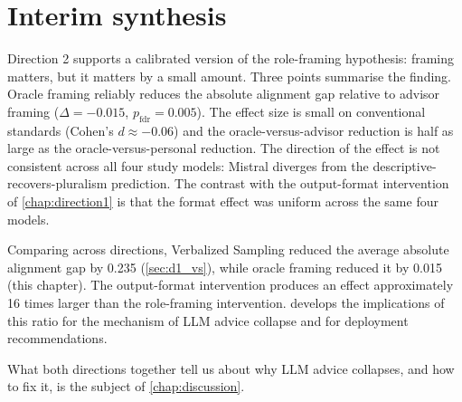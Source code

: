 \section{Interim synthesis}
\label{sec:d2_synthesis}

Direction 2 supports a calibrated version of the role-framing
hypothesis: framing matters, but it matters by a small amount. Three
points summarise the finding. Oracle framing reliably reduces the
absolute alignment gap relative to advisor framing
($\Delta = -0.015$, $p_\text{fdr} = 0.005$). The effect size is small
on conventional standards (Cohen's $d \approx -0.06$) and the
oracle-versus-advisor reduction is half as large as the
oracle-versus-personal reduction. The direction of the effect is not
consistent across all four study models: Mistral diverges from the
descriptive-recovers-pluralism prediction. The contrast with the
output-format intervention of \cref{chap:direction1} is that the
format effect was uniform across the same four models.

Comparing across directions, Verbalized Sampling reduced the average
absolute alignment gap by 0.235 (\cref{sec:d1_vs}), while oracle framing
reduced it by 0.015 (this chapter). The output-format intervention
produces an effect approximately 16 times larger than the role-framing
intervention.  develops the implications of this
ratio for the mechanism of LLM advice collapse and for deployment
recommendations.

What both directions together tell us about why LLM advice collapses,
and how to fix it, is the subject of \cref{chap:discussion}.
